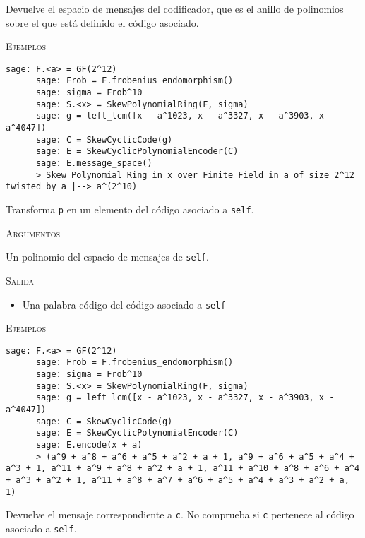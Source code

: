 \begin{description}[leftmargin=1em, font=\normalfont\ttfamily, style=nextline]
  \begin{description}[font=\ttfamily, style=nextline]
    \item[message\_space(self)] Devuelve el espacio de mensajes del codificador, que es el anillo de polinomios sobre el que está definido el código asociado.
    
    \textsc{Ejemplos}
    \begin{lstlisting}[gobble=6]
      sage: F.<a> = GF(2^12)
      sage: Frob = F.frobenius_endomorphism()
      sage: sigma = Frob^10
      sage: S.<x> = SkewPolynomialRing(F, sigma)
      sage: g = left_lcm([x - a^1023, x - a^3327, x - a^3903, x - a^4047])
      sage: C = SkewCyclicCode(g)
      sage: E = SkewCyclicPolynomialEncoder(C)
      sage: E.message_space()
      > Skew Polynomial Ring in x over Finite Field in a of size 2^12 twisted by a |--> a^(2^10)
    \end{lstlisting}

    \item[encode(self, p)] Transforma \texttt{p} en un elemento del código asociado a \texttt{self}.
    
    \textsc{Argumentos}
    \begin{description}[font=\normalfont\ttfamily]
      \item[p] Un polinomio del espacio de mensajes de \texttt{self}.
    \end{description}

    \textsc{Salida}
    \begin{itemize}
      \item Una palabra código del código asociado a \texttt{self}
    \end{itemize}
    
    \textsc{Ejemplos}
    \begin{lstlisting}[gobble=6]
      sage: F.<a> = GF(2^12)
      sage: Frob = F.frobenius_endomorphism()
      sage: sigma = Frob^10
      sage: S.<x> = SkewPolynomialRing(F, sigma)
      sage: g = left_lcm([x - a^1023, x - a^3327, x - a^3903, x - a^4047])
      sage: C = SkewCyclicCode(g)
      sage: E = SkewCyclicPolynomialEncoder(C)
      sage: E.encode(x + a)
      > (a^9 + a^8 + a^6 + a^5 + a^2 + a + 1, a^9 + a^6 + a^5 + a^4 + a^3 + 1, a^11 + a^9 + a^8 + a^2 + a + 1, a^11 + a^10 + a^8 + a^6 + a^4 + a^3 + a^2 + 1, a^11 + a^8 + a^7 + a^6 + a^5 + a^4 + a^3 + a^2 + a, 1)
    \end{lstlisting}

    \item[unencode\_nocheck(self, c)] Devuelve el mensaje correspondiente a \texttt{c}.
    No comprueba si \texttt{c} pertenece al código asociado a \texttt{self}.
    

\end{description}
\end{description}
